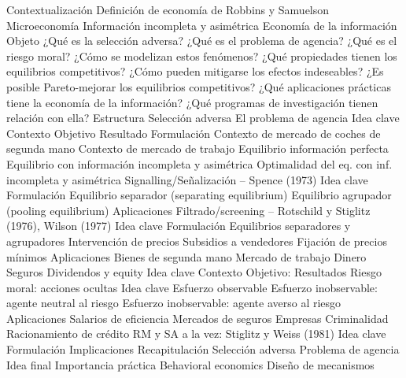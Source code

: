 \documentclass{nuevotema}
\begin{document}
\begin{esquema}[enumerate]
	\1[] 
		\2 Contextualización
			\3 Definición de economía de Robbins y Samuelson
			\3 Microeconomía
			\3 Información incompleta y asimétrica
			\3 Economía de la información
		\2 Objeto
			\3 ¿Qué es la selección adversa?
			\3 ¿Qué es el problema de agencia?
			\3 ¿Qué es el riesgo moral?
			\3 ¿Cómo se modelizan estos fenómenos?
			\3 ¿Qué propiedades tienen los equilibrios competitivos?
			\3 ¿Cómo pueden mitigarse los efectos indeseables?
			\3 ¿Es posible Pareto-mejorar los equilibrios competitivos?
			\3 ¿Qué aplicaciones prácticas tiene la economía de la información?
			\3 ¿Qué programas de investigación tienen relación con ella?
		\2 Estructura
			\3 Selección adversa
			\3 El problema de agencia
	\1 
		\2 Idea clave
			\3 Contexto
			\3 Objetivo
			\3 Resultado
		\2 Formulación
			\3 Contexto de mercado de coches de segunda mano
			\3 Contexto de mercado de trabajo
			\3 Equilibrio información perfecta
			\3 Equilibrio con información incompleta y asimétrica
			\3 Optimalidad del eq. con inf. incompleta y asimétrica
		\2 Signalling/Señalización -- Spence (1973)
			\3 Idea clave
			\3 Formulación
			\3 Equilibrio separador (separating equilibrium)
			\3 Equilibrio agrupador (pooling equilibrium)
			\3 Aplicaciones
		\2 Filtrado/screening -- Rotschild y Stiglitz (1976), Wilson (1977)
			\3 Idea clave
			\3 Formulación
			\3 Equilibrios separadores y agrupadores
		\2 Intervención de precios
			\3 Subsidios a vendedores
			\3 Fijación de precios mínimos
		\2 Aplicaciones
			\3 Bienes de segunda mano
			\3 Mercado de trabajo
			\3 Dinero
			\3 Seguros
			\3 Dividendos y equity
	\1 
		\2 Idea clave
			\3 Contexto
			\3 Objetivo:
			\3 Resultados
		\2 Riesgo moral: acciones ocultas
			\3 Idea clave
			\3 Esfuerzo observable
			\3 Esfuerzo inobservable: agente neutral al riesgo
			\3 Esfuerzo inobservable: agente averso al riesgo
		\2 Aplicaciones
			\3 Salarios de eficiencia
			\3 Mercados de seguros
			\3 Empresas
			\3 Criminalidad
			\3 Racionamiento de crédito
		\2 RM y SA a la vez: Stiglitz y Weiss (1981)
			\3 Idea clave
			\3 Formulación
			\3 Implicaciones
	\1[] 
		\2 Recapitulación
			\3 Selección adversa
			\3 Problema de agencia
		\2 Idea final
			\3 Importancia práctica
			\3 Behavioral economics
			\3 Diseño de mecanismos

\end{esquema}

\esquemalargo
\end{document}
